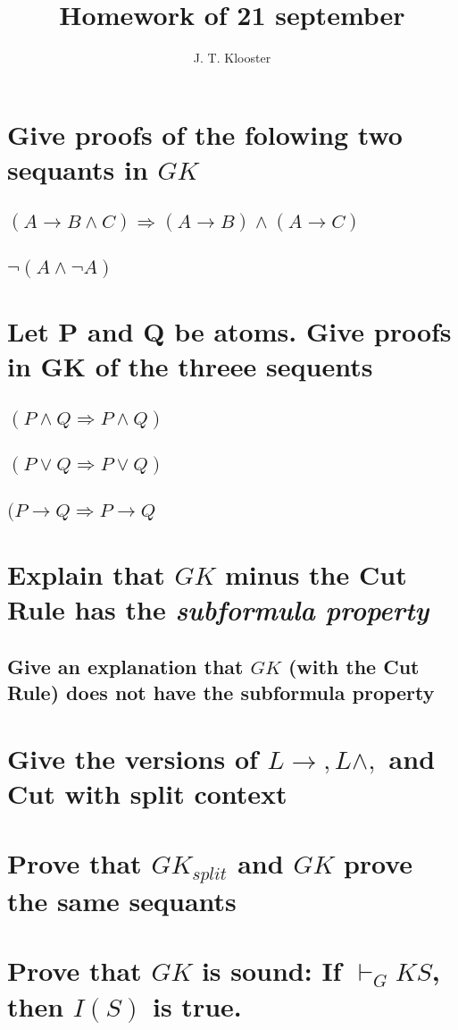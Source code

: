 \documentclass{article}
\begin{document}
\author{J. T. Klooster}
\title{Homework of 21 september}
\maketitle

\section{Give proofs of the folowing two sequants in $GK$}
\subsection{$(A\to B\wedge C)\Rightarrow(A\to B)\wedge(A\to C)$}

\begin{prooftree}
\end{prooftree}

\subsection{$\neg(A\wedge\neg A)$}
\section{Let P and Q be atoms. Give proofs in GK of the threee sequents}
\subsection{$(P\wedge Q \Rightarrow P \wedge Q)$}
\subsection{$(P\vee Q \Rightarrow P \vee Q)$}
\subsection{$(P \to Q \Rightarrow P \to Q$}
\section{Explain that $GK$ minus the Cut Rule has the \emph{subformula property}}
\subsection{Give an explanation that $GK$ (with the Cut Rule) does not have
the subformula property}
\section{Give the versions of $L \to, L\wedge,$ and Cut with split context}
\section{Prove that $GK_{split}$ and $GK$ prove the same sequants}
\section{Prove that $GK$ is sound: If $\vdash_GK S$, then $I(S)$ is true.}
\end{document}
